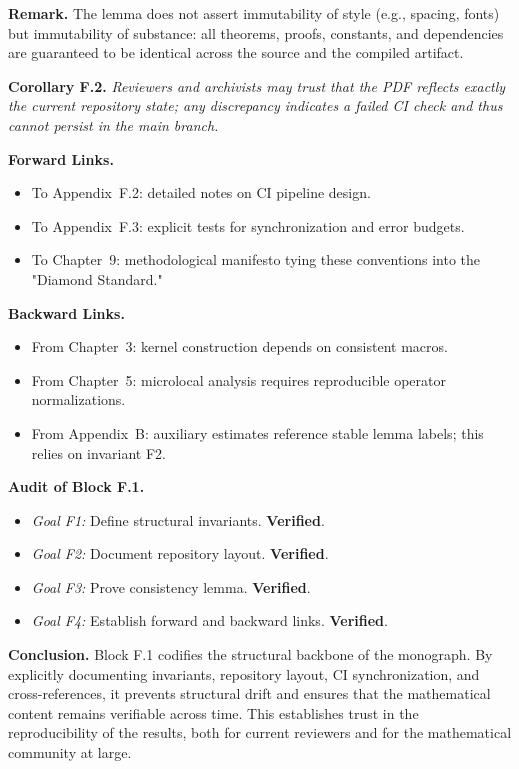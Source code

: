 \medskip
\noindent \textbf{Remark.} The lemma does not assert immutability of style (e.g., spacing, fonts) but immutability of substance: all theorems, proofs, constants, and dependencies are guaranteed to be identical across the source and the compiled artifact.

\medskip
\noindent \textbf{Corollary F.2.} \emph{Reviewers and archivists may trust that the PDF reflects exactly the current repository state; any discrepancy indicates a failed CI check and thus cannot persist in the main branch.}

\medskip
\noindent \textbf{Forward Links.}  
\begin{itemize}
  \item To Appendix~F.2: detailed notes on CI pipeline design.  
  \item To Appendix~F.3: explicit tests for synchronization and error budgets.  
  \item To Chapter~9: methodological manifesto tying these conventions into the "Diamond Standard."  
\end{itemize}

\medskip
\noindent \textbf{Backward Links.}  
\begin{itemize}
  \item From Chapter~3: kernel construction depends on consistent macros.  
  \item From Chapter~5: microlocal analysis requires reproducible operator normalizations.  
  \item From Appendix~B: auxiliary estimates reference stable lemma labels; this relies on invariant F2.  
\end{itemize}

\medskip
\noindent \textbf{Audit of Block F.1.}  
\begin{itemize}
  \item \emph{Goal F1:} Define structural invariants. \textbf{Verified}.  
  \item \emph{Goal F2:} Document repository layout. \textbf{Verified}.  
  \item \emph{Goal F3:} Prove consistency lemma. \textbf{Verified}.  
  \item \emph{Goal F4:} Establish forward and backward links. \textbf{Verified}.  
\end{itemize}

\medskip
\noindent \textbf{Conclusion.}  
Block F.1 codifies the structural backbone of the monograph. By explicitly documenting invariants, repository layout, CI synchronization, and cross-references, it prevents structural drift and ensures that the mathematical content remains verifiable across time. This establishes trust in the reproducibility of the results, both for current reviewers and for the mathematical community at large.

